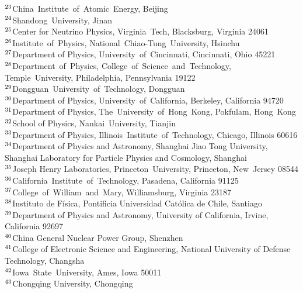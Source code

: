 {$^{23}$China~Institute~of~Atomic~Energy, Beijing \\ 
$^{24}$Shandong~University, Jinan \\ 
$^{25}$Center for Neutrino Physics, Virginia~Tech, Blacksburg, Virginia  24061 \\ 
$^{26}$Institute~of~Physics, National~Chiao-Tung~University, Hsinchu \\ 
$^{27}$Department of Physics, University~of~Cincinnati, Cincinnati, Ohio 45221 \\ 
$^{28}$Department~of~Physics, College~of~Science~and~Technology, Temple~University, Philadelphia, Pennsylvania  19122 \\ 
$^{29}$Dongguan~University~of~Technology, Dongguan \\ 
$^{30}$Department of Physics, University~of~California, Berkeley, California  94720 \\ 
$^{31}$Department of Physics, The~University~of~Hong~Kong, Pokfulam, Hong~Kong \\ 
$^{32}$School of Physics, Nankai~University, Tianjin \\ 
$^{33}$Department of Physics, Illinois~Institute~of~Technology, Chicago, Illinois  60616 \\ 
$^{34}$Department of Physics and Astronomy, Shanghai Jiao Tong University, Shanghai Laboratory for Particle Physics and Cosmology, Shanghai \\ 
$^{35}$Joseph Henry Laboratories, Princeton~University, Princeton, New~Jersey 08544 \\ 
$^{36}$California~Institute~of~Technology, Pasadena, California 91125 \\ 
$^{37}$College~of~William~and~Mary, Williamsburg, Virginia  23187 \\ 
$^{38}$Instituto de F\'isica, Pontificia Universidad Cat\'olica de Chile, Santiago \\ 
$^{39}$Department of Physics and Astronomy, University of California, Irvine, California 92697 \\ 
$^{40}$China General Nuclear Power Group, Shenzhen \\ 
$^{41}$College of Electronic Science and Engineering, National University of Defense Technology, Changsha \\ 
$^{42}$Iowa~State~University, Ames, Iowa  50011 \\ 
$^{43}$Chongqing University, Chongqing \\ 
} 
